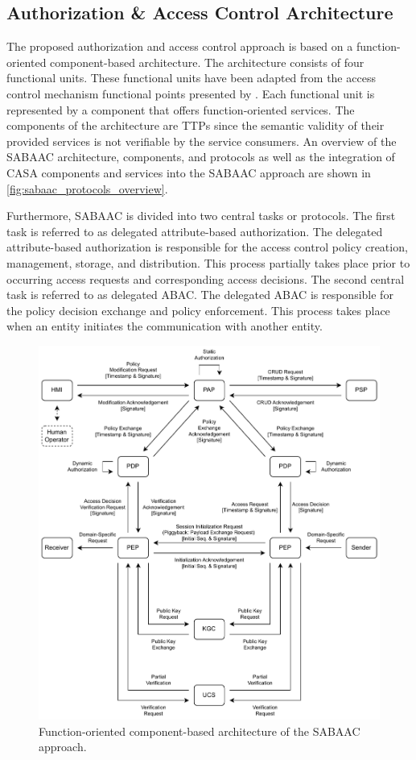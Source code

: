 \subsection{Authorization \& Access Control Architecture}
The proposed authorization and access control approach is based on a function-oriented component-based architecture.
The architecture consists of four functional units.
These functional units have been adapted from the access control mechanism functional points presented by \citeauthor{Hu2014} \cite{Hu2014}.
Each functional unit is represented by a component that offers function-oriented services.
The components of the architecture are TTPs since the semantic validity of their provided services is not verifiable by the service consumers.
An overview of the SABAAC architecture, components, and protocols as well as the integration of CASA components and services into the SABAAC approach are shown in \autoref{fig:sabaac_protocols_overview}.

Furthermore, SABAAC is divided into two central tasks or protocols.
The first task is referred to as delegated attribute-based authorization.
The delegated attribute-based authorization is responsible for the access control policy creation, management, storage, and distribution.
This process partially takes place prior to occurring access requests and corresponding access decisions.
The second central task is referred to as delegated ABAC.
The delegated ABAC is responsible for the policy decision exchange and policy enforcement.
This process takes place when an entity initiates the communication with another entity.
\begin{figure}
	\centering
    \includegraphics[width=0.8\linewidth]{figures/SABAAC_protocols_overview.drawio.pdf}
	\caption{Function-oriented component-based architecture of the SABAAC approach.}
	\label{fig:sabaac_protocols_overview}
\end{figure}

